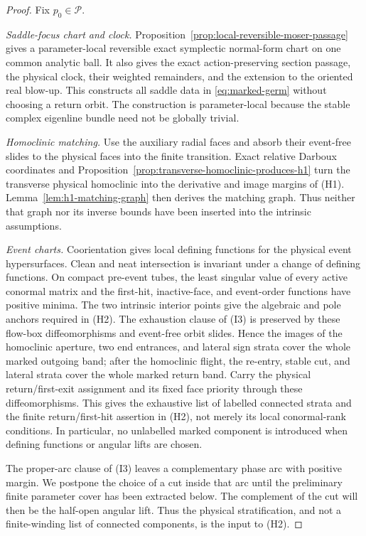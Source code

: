 \documentclass[11pt]{amsart}
\numberwithin{equation}{section}
\theoremstyle{definition}
\theoremstyle{remark}
\begin{document}
\begin{proof}
Fix $p_0\in\mathcal P$.

\emph{Saddle-focus chart and clock.}
Proposition~\ref{prop:local-reversible-moser-passage} gives a
parameter-local reversible exact symplectic normal-form chart on one
common analytic ball.  It also gives the exact action-preserving section
passage, the physical clock, their weighted remainders, and the extension
to the oriented real blow-up.  This constructs all saddle data in
\eqref{eq:marked-germ} without choosing a return orbit.  The construction
is parameter-local because the stable complex eigenline bundle need not be
globally trivial.

\emph{Homoclinic matching.}
Use the auxiliary radial faces and absorb their event-free slides to the
physical faces into the finite transition.  Exact relative Darboux
coordinates and
Proposition~\ref{prop:transverse-homoclinic-produces-h1}
turn the transverse physical homoclinic into the derivative and image
margins of \textup{(H1)}.  Lemma~\ref{lem:h1-matching-graph} then derives
the matching graph.  Thus neither that graph nor its inverse bounds have
been inserted into the intrinsic assumptions.

\emph{Event charts.}
Coorientation gives local defining functions for the physical event
hypersurfaces.  Clean and neat intersection is invariant under a change of
defining functions.  On compact pre-event tubes, the least singular value
of every active conormal matrix and the first-hit, inactive-face, and
event-order functions have positive minima.  The two intrinsic interior
points give the algebraic and pole anchors required in \textup{(H2)}.
The exhaustion clause of \textup{(I3)} is preserved by these flow-box
diffeomorphisms and event-free orbit slides.  Hence the images of the
homoclinic aperture, two end entrances, and lateral sign strata cover the
whole marked outgoing band; after the homoclinic flight, the re-entry,
stable cut, and lateral strata cover the whole marked return band.  Carry
the physical return/first-exit assignment and its fixed face priority through
these diffeomorphisms.  This gives the exhaustive list of labelled
connected strata and the finite
return/first-hit assertion in \textup{(H2)}, not merely its local conormal-rank
conditions.  In particular, no unlabelled marked component is introduced
when defining functions or angular lifts are chosen.

The proper-arc clause of \textup{(I3)} leaves a complementary phase arc
with positive margin.  We postpone the choice of a cut inside that arc
until the preliminary finite parameter cover has been extracted below.
The complement of the cut will then be the half-open angular lift.  Thus
the physical stratification, and not a finite-winding list of connected components, is
the input to \textup{(H2)}.


\end{proof}
\end{document}
